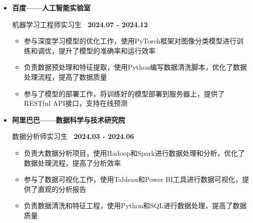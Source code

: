 \documentclass[zh]{resume}
\begin{document}
\vspace{-0.4em} 

\newcommand{\experienceitem}[4]{%
  \noindent 
  \begin{minipage}[t]{\linewidth} 
    {\Large\bfseries\textcolor{accentcolor}{#1}}\par  %
    
    \vspace{0.3em} 
    \hspace*{0.7em}  %
    \icon{\faUserCog}  %
    {\large\textcolor{linkcolor}{#2}}  %
    \hfill  %
    {\normalsize\bfseries\textcolor{gray!60!black}{\faCalendar*~#3}}\par  %
    
    \vspace{0.8em} 
    #4 
  \end{minipage} 
  \vspace{1.2em} 
} 

\begin{itemize}[leftmargin=1.0em, nosep, before=\vspace{-0.5em}] 
  \vspace{0.6em} 
  \item[] 
  \experienceitem{百度——人工智能实验室} %
    {机器学习工程师实习生} %
    {2024.07 - 2024.12} %
    {\begin{itemize}[label=\faAngleRight, leftmargin=2.2em, nosep, topsep=0pt] 
       \item 参与深度学习模型的优化工作，使用PyTorch框架对图像分类模型进行训练和调优，提升了模型的准确率和运行效率 
       \item 负责数据预处理和特征提取，使用Python编写数据清洗脚本，优化了数据处理流程，提高了数据质量 
       \item 参与了模型的部署工作，将训练好的模型部署到服务器上，提供了RESTful API接口，支持在线预测 
     \end{itemize}} 
    
  \vspace{-1em} 
  \item[] 
  \experienceitem{阿里巴巴——数据科学与技术研究院} %
    {数据分析师实习生} %
    {2024.03 - 2024.06} %
    {\begin{itemize}[label=\faAngleRight, leftmargin=2.2em, nosep, topsep=0pt] 
       \item 负责大数据分析项目，使用Hadoop和Spark进行数据处理和分析，优化了数据处理流程，提高了分析效率 
       \item 参与了数据可视化工作，使用Tableau和Power BI工具进行数据可视化，提供了直观的分析报告 
       \item 负责数据清洗和特征工程，使用Python和SQL进行数据处理，提高了数据质量 
     \end{itemize}} 
\end{itemize} 
\end{document}
